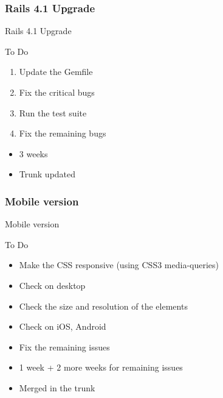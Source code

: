 \documentclass[10pt,a4paper]{beamer}
\begin{document}
\subsubsection{Rails 4.1 Upgrade}

\begin{frame}{Rails 4.1 Upgrade}
  \begin{block}{To Do}
    \begin{enumerate}
      \item Update the Gemfile
      \item Fix the critical bugs
      \item Run the test suite
      \item Fix the remaining bugs
    \end{enumerate}
  \end{block}
  
  \begin{block}{}
    \begin{itemize}
      \item 3 weeks
      \item Trunk updated
    \end{itemize}
  \end{block}
\end{frame}

\subsubsection{Mobile version}

\begin{frame}{Mobile version}
  \begin{block}{To Do}
    \begin{itemize}
      \item Make the CSS responsive (using CSS3 media-queries)
      \item Check on desktop 
      \item Check the size and resolution of the elements
      \item Check on iOS, Android
      \item Fix the remaining issues 
    \end{itemize}
  \end{block}
  
  \begin{block}{}
    \begin{itemize}
      \item 1 week + 2 more weeks for remaining issues
      \item Merged in the trunk
    \end{itemize}
  \end{block}
\end{frame}
\end{document}
